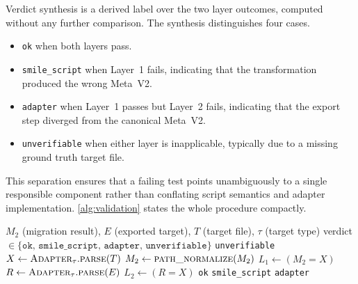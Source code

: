   Verdict synthesis is a derived label over the two layer outcomes, computed
  without any further comparison. The synthesis distinguishes four cases.
  \begin{itemize}
    \item \texttt{ok} when both layers pass.
    \item \texttt{smile\_script} when Layer~1 fails, indicating that the
          transformation produced the wrong Meta~V2.
    \item \texttt{adapter} when Layer~1 passes but Layer~2 fails, indicating
          that the export step diverged from the canonical Meta~V2.
    \item \texttt{unverifiable} when either layer is inapplicable, typically
          due to a missing ground truth target file.
  \end{itemize}
  This separation ensures that a failing test points unambiguously to a
  single responsible component rather than conflating script semantics and
  adapter implementation. \autoref{alg:validation} states the whole
  procedure compactly.

  \begin{algorithm}[htbp]
  \caption{Two layer validation with verdict synthesis.}
  \label{alg:validation}
  \begin{algorithmic}[1]
  \Require $M_2$ (migration result), $E$ (exported target), $T$ (target file), $\tau$ (target type)
  \Ensure verdict $\in \{\texttt{ok},\,\texttt{smile\_script},\,\texttt{adapter},\,\texttt{unverifiable}\}$
   \Return \texttt{unverifiable} \EndIf
  \State $X \gets \textsc{Adapter}_\tau.\textsc{parse}(T)$ 
   \State $M_2 \gets \textsc{path\_normalize}(M_2)$ \EndIf
  \State $L_1 \gets (M_2 = X)$ 
  \State $R \gets \textsc{Adapter}_\tau.\textsc{parse}(E)$
  \State $L_2 \gets (R = X)$ 
   \Return \texttt{ok} \EndIf
   \Return \texttt{smile\_script} \EndIf
  \State \Return \texttt{adapter}
  \end{algorithmic}
  \end{algorithm}

